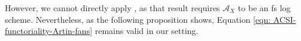 \documentclass{article}
\newtheorem{proposition}[definition]{Proposition}
\begin{document}
However, we cannot directly apply \cite[Proposition~2.10]{ACGSI}, as that result requires $\mathcal{A}_X$ to be an fs log scheme. Nevertheless, as the following proposition shows, Equation \eqref{eqn: ACSI-functoriality-Artin-fans} remains valid in our setting.


\end{document}
